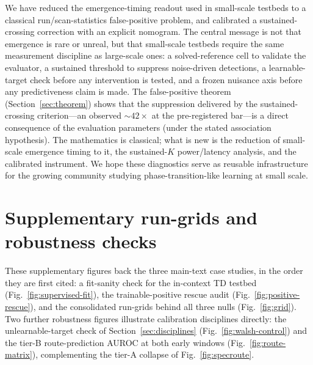 \documentclass[11pt]{article}
\theoremstyle{plain}
\theoremstyle{definition}
\begin{document}
We have reduced the emergence-timing readout used in small-scale testbeds to a classical
run/scan-statistics false-positive problem, and calibrated a sustained-crossing correction
with an explicit nomogram.
The central message is not that emergence is rare or unreal, but that small-scale
testbeds require the same measurement discipline as large-scale ones: a solved-reference
cell to validate the evaluator, a sustained threshold to suppress noise-driven detections,
a learnable-target check before any intervention is tested, and a frozen nuisance axis
before any predictiveness claim is made.
The false-positive theorem (Section~\ref{sec:theorem}) shows that the suppression
delivered by the sustained-crossing criterion---an observed ${\sim}42\times$ at the
pre-registered bar---is a direct consequence of the evaluation
parameters (under the stated association hypothesis).
The mathematics is classical; what is new is the reduction of small-scale emergence timing
to it, the sustained-$K$ power/latency analysis, and the calibrated instrument.
We hope these diagnostics serve as reusable infrastructure for the growing community
studying phase-transition-like learning at small scale.

\appendix
\setcounter{figure}{0}
\setcounter{table}{0}
\renewcommand{\theHfigure}{A\arabic{figure}}
\renewcommand{\theHtable}{A\arabic{table}}
\section{Supplementary run-grids and robustness checks}\label{app:grid}

These supplementary figures back the three main-text case studies, in the order they are
first cited: a fit-sanity check for the in-context TD testbed
(Fig.~\ref{fig:supervised-fit}), the trainable-positive rescue audit
(Fig.~\ref{fig:positive-rescue}), and the consolidated run-grids behind all
three nulls (Fig.~\ref{fig:grid}).
Two further robustness figures illustrate calibration disciplines directly: the
unlearnable-target check of Section~\ref{sec:disciplines} (Fig.~\ref{fig:walsh-control}) and
the tier-B route-prediction AUROC at both early windows
(Fig.~\ref{fig:route-matrix}), complementing the tier-A collapse of Fig.~\ref{fig:specroute}.
\end{document}
